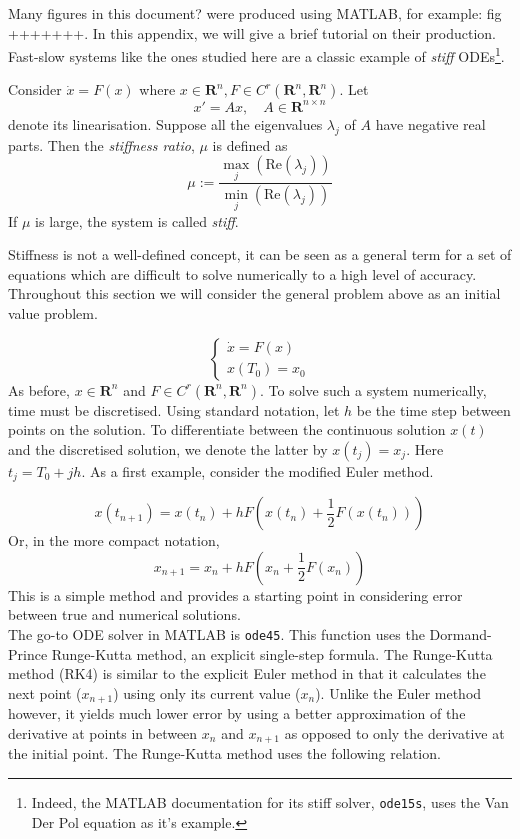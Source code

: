 
Many figures in this document? were produced using MATLAB, for example: fig +++++++. In this appendix, we will give a brief tutorial on their production. Fast-slow systems like the ones studied here are a classic example of \emph{stiff} ODEs\footnote{Indeed, the MATLAB documentation for its stiff solver, \texttt{ode15s}, uses the Van Der Pol equation as it's example.}. 
\begin{definition}
	Consider $\dot{x} = F(x)$ where $x\in \mathbf{R}^n, F\in C^r(\mathbf{R}^n,\mathbf{R}^n)$. Let 
	$$ x' = Ax,\quad A\in \mathbf{R}^{n \times n}  $$
	denote its linearisation. Suppose all the eigenvalues $\lambda_j$  of $A$ have negative real parts. Then the \emph{stiffness ratio}, $\mu$ is defined as
	$$ \mu :=\frac{\max_j(\mathrm{Re}(\lambda_j))}{\min_j(\mathrm{Re}(\lambda_j))} $$
	If $\mu$ is large, the system is called \emph{stiff}.
\end{definition}
Stiffness is not a well-defined concept, it can be seen as a general term for a set of equations which are difficult to solve numerically to a high level of accuracy. Throughout this section we will consider the general problem above as an initial value problem.

$$ \begin{cases}
\dot{x} = F(x)\\
x(T_0)=x_0
\end{cases}$$
As before, $x\in \mathbf{R}^n$ and $ F\in C^r(\mathbf{R}^n,\mathbf{R}^n)$. To solve such a system numerically, time must be discretised. Using standard notation, let $h$ be the time step between points on the solution. To differentiate between the continuous solution $x(t)$ and the discretised solution, we denote the latter by $x(t_j)=x_j$. Here $t_j = T_0+jh$. As a first example, consider the modified Euler method.

$$ x(t_{n+1})=x(t_n)+hF\left( x(t_n) +\frac{1}{2}F(x(t_n))\right)$$
Or, in the more compact notation, 
$$x_{n+1}=x_n+hF\left( x_n +\frac{1}{2}F(x_n)\right)$$
This is a simple method and provides a starting point in considering error between true and numerical solutions.\\

The go-to ODE solver in MATLAB is \texttt{ode45}. This function uses the Dormand-Prince Runge-Kutta method, an explicit single-step formula. The Runge-Kutta method (RK4) is similar to the explicit Euler method in that it calculates the next point ($x_{n+1}$) using only its current value ($x_n$). Unlike the Euler method however, it yields much lower error by using a better approximation of the derivative at points in between $x_n$ and $x_{n+1}$ as opposed to only the derivative at the initial point. The Runge-Kutta method uses the following relation.


